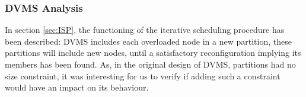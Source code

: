 


\subsubsection{DVMS Analysis}

In section \ref{sec:ISP}, the functioning of the iterative scheduling procedure
has been described: DVMS includes each overloaded node in a new partition, these
partitions will include new nodes, until a satisfactory reconfiguration implying
its members has been found. As, in the original design of DVMS, partitions had
no size constraint, it was interesting for us to verify if adding such a
constraint would have an impact on its behaviour.


